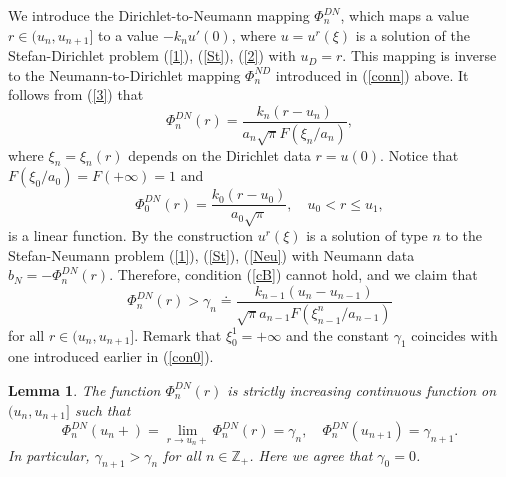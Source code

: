 \documentclass[10pt,a4paper]{amsart}
\newtheorem{lemma}{Lemma}[section]
\numberwithin{equation}{section}
\newcommand{\Z}{{\mathbb Z}}
\begin{document}
We introduce the Dirichlet-to-Neumann mapping $\Phi^{DN}_n$, which maps a value $r\in (u_n,u_{n+1}]$ to a value $-k_nu'(0)$, where $u=u^r(\xi)$ is a solution of the Stefan-Dirichlet problem (\ref{1}), (\ref{St}), (\ref{2}) with  $u_D=r$. This mapping is inverse to the Neumann-to-Dirichlet mapping $\Phi^{ND}_n$ introduced in (\ref{conn}) above. It follows from (\ref{3}) that
\begin{equation}\label{dnn}
\Phi^{DN}_n(r)=\frac{k_n(r-u_n)}{a_n\sqrt{\pi}F(\xi_n/a_n)},
\end{equation}
where $\xi_n=\xi_n(r)$ depends on the Dirichlet data $r=u(0)$. Notice that ${F(\xi_0/a_0)=F(+\infty)=1}$ and
\begin{equation}\label{dn0}\Phi^{DN}_0(r)=\frac{k_0(r-u_0)}{a_0\sqrt{\pi}}, \quad u_0<r\le u_1,\end{equation}
is a linear function. By the construction $u^r(\xi)$ is a solution of type $n$ to the Stefan-Neumann problem (\ref{1}), (\ref{St}), (\ref{Neu}) with Neumann data
$b_N=-\Phi^{DN}_n(r)$. Therefore, condition (\ref{cB}) cannot hold, and we claim that
\[\Phi^{DN}_n(r)>\gamma_n\doteq\frac{k_{n-1}(u_n-u_{n-1})}{\sqrt{\pi}a_{n-1}F(\xi_{n-1}^n/a_{n-1})}\]
for all $r\in (u_n,u_{n+1}]$. Remark that $\xi^1_0=+\infty$ and the constant $\gamma_1$ coincides with one introduced earlier in (\ref{con0}).

\begin{lemma}\label{lem2}
The function $\Phi^{DN}_n(r)$ is strictly increasing continuous function on $(u_n,u_{n+1}]$ such that
\[
\Phi^{DN}_n(u_n+)=\lim_{r\to u_n+}\Phi^{DN}_n(r)=\gamma_n, \quad \Phi^{DN}_n(u_{n+1})=\gamma_{n+1}.
\]
In particular, $\gamma_{n+1}>\gamma_n$ for all $n\in\Z_+$. Here we agree that $\gamma_0=0$.
\end{lemma}
\end{document}
